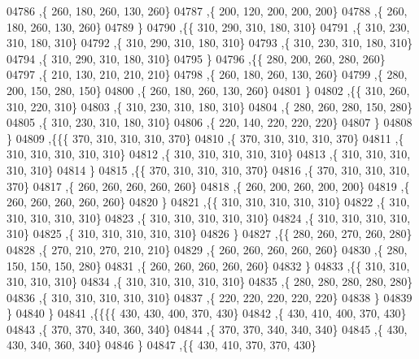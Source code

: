 \begin{DoxyCode}
04786     ,\{   260,   180,   260,   130,   260\}
04787     ,\{   200,   120,   200,   200,   200\}
04788     ,\{   260,   180,   260,   130,   260\}
04789     \}
04790    ,\{\{   310,   290,   310,   180,   310\}
04791     ,\{   310,   230,   310,   180,   310\}
04792     ,\{   310,   290,   310,   180,   310\}
04793     ,\{   310,   230,   310,   180,   310\}
04794     ,\{   310,   290,   310,   180,   310\}
04795     \}
04796    ,\{\{   280,   200,   260,   280,   260\}
04797     ,\{   210,   130,   210,   210,   210\}
04798     ,\{   260,   180,   260,   130,   260\}
04799     ,\{   280,   200,   150,   280,   150\}
04800     ,\{   260,   180,   260,   130,   260\}
04801     \}
04802    ,\{\{   310,   260,   310,   220,   310\}
04803     ,\{   310,   230,   310,   180,   310\}
04804     ,\{   280,   260,   280,   150,   280\}
04805     ,\{   310,   230,   310,   180,   310\}
04806     ,\{   220,   140,   220,   220,   220\}
04807     \}
04808    \}
04809   ,\{\{\{   370,   310,   310,   310,   370\}
04810     ,\{   370,   310,   310,   310,   370\}
04811     ,\{   310,   310,   310,   310,   310\}
04812     ,\{   310,   310,   310,   310,   310\}
04813     ,\{   310,   310,   310,   310,   310\}
04814     \}
04815    ,\{\{   370,   310,   310,   310,   370\}
04816     ,\{   370,   310,   310,   310,   370\}
04817     ,\{   260,   260,   260,   260,   260\}
04818     ,\{   260,   200,   260,   200,   200\}
04819     ,\{   260,   260,   260,   260,   260\}
04820     \}
04821    ,\{\{   310,   310,   310,   310,   310\}
04822     ,\{   310,   310,   310,   310,   310\}
04823     ,\{   310,   310,   310,   310,   310\}
04824     ,\{   310,   310,   310,   310,   310\}
04825     ,\{   310,   310,   310,   310,   310\}
04826     \}
04827    ,\{\{   280,   260,   270,   260,   280\}
04828     ,\{   270,   210,   270,   210,   210\}
04829     ,\{   260,   260,   260,   260,   260\}
04830     ,\{   280,   150,   150,   150,   280\}
04831     ,\{   260,   260,   260,   260,   260\}
04832     \}
04833    ,\{\{   310,   310,   310,   310,   310\}
04834     ,\{   310,   310,   310,   310,   310\}
04835     ,\{   280,   280,   280,   280,   280\}
04836     ,\{   310,   310,   310,   310,   310\}
04837     ,\{   220,   220,   220,   220,   220\}
04838     \}
04839    \}
04840   \}
04841  ,\{\{\{\{   430,   430,   400,   370,   430\}
04842     ,\{   430,   410,   400,   370,   430\}
04843     ,\{   370,   370,   340,   360,   340\}
04844     ,\{   370,   370,   340,   340,   340\}
04845     ,\{   430,   430,   340,   360,   340\}
04846     \}
04847    ,\{\{   430,   410,   370,   370,   430\}

\end{DoxyCode}

